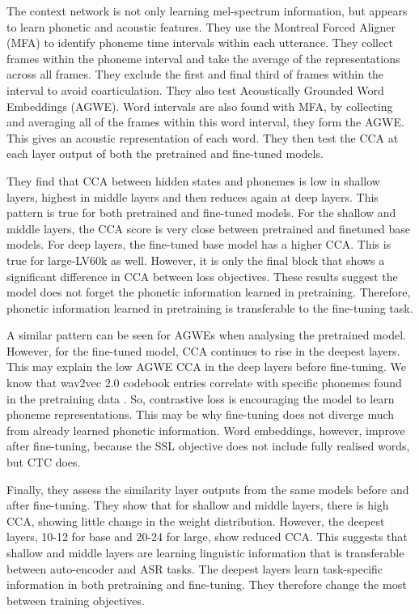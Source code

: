 The context network is not only learning mel-spectrum information, but appears to learn phonetic and acoustic features. They use the Montreal Forced Aligner (MFA) \cite{mcauliffe2017montreal} to identify phoneme time intervals within each utterance. They collect frames within the phoneme interval and take the average of the representations across all frames. They exclude the first and final third of frames within the interval to avoid coarticulation. They also test Acoustically Grounded Word Embeddings (AGWE).  Word intervals are also found with MFA, by collecting and averaging all of the frames within this word interval, they form the AGWE. This gives an acoustic representation of each word. They then test the CCA at each layer output of both the pretrained and fine-tuned models.

They find that CCA between hidden states and phonemes is low in shallow layers, highest in middle layers and then reduces again at deep layers. This pattern is true for both pretrained and fine-tuned models. For the shallow and middle layers, the CCA score is very close between pretrained and finetuned base models. For deep layers, the fine-tuned base model has a higher CCA. This is true for large-LV60k as well. However, it is only the final block that shows a significant difference in CCA between loss objectives. These results suggest the model does not forget the phonetic information learned in pretraining. Therefore, phonetic information learned in pretraining is transferable to the fine-tuning task.

A similar pattern can be seen for AGWEs when analysing the pretrained model. However, for the fine-tuned model, CCA continues to rise in the deepest layers. This may explain the low AGWE CCA in the deep layers before fine-tuning. We know that wav2vec 2.0 codebook entries correlate with specific phonemes found in the pretraining data \cite{wav2vec}. So, contrastive loss is encouraging the model to learn phoneme representations. This may be why fine-tuning does not diverge much from already learned phonetic information. Word embeddings, however, improve after fine-tuning, because the SSL objective does not include fully realised words, but CTC does.

Finally, they assess the similarity layer outputs from the same models before and after fine-tuning. They show that for shallow and middle layers, there is high CCA, showing little change in the weight distribution. However, the deepest layers, 10-12 for base and 20-24 for large, show reduced CCA. This suggests that shallow and middle layers are learning linguistic information that is transferable between auto-encoder and ASR tasks. The deepest layers learn task-specific information in both pretraining and fine-tuning. They therefore change the most between training objectives.


